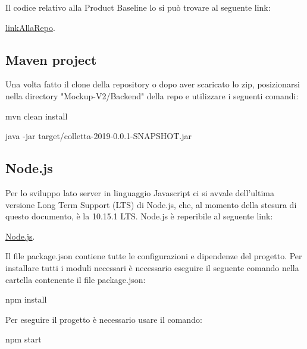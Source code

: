 Il codice relativo alla Product Baseline lo si può trovare al seguente link:
\begin{center}
\href{https://github.com/SWEightgroup/Development}{linkAllaRepo}. 
\end{center}

\subsection{Maven project}
Una volta fatto il clone della repository o dopo aver scaricato lo zip, posizionarsi nella directory "Mockup-V2/Backend" della repo e utilizzare i seguenti comandi:

\begin{center}
\textsf{mvn clean install}
\end{center}

\begin{center}
\textsf{java -jar target/colletta-2019-0.0.1-SNAPSHOT.jar}
\end{center}

\subsection{Node.js}
Per lo sviluppo lato server in linguaggio Javascript ci si avvale dell’ultima versione Long Term Support (LTS) di Node.js, che, al momento della stesura di questo documento, è la 10.15.1 LTS. Node.js è reperibile al
seguente link:

\begin{center}
\href{https://nodejs.org/it/}{Node.js}. 
\end{center}

Il file package.json contiene tutte le configurazioni e dipendenze del progetto. Per installare tutti i moduli
necessari è necessario eseguire il seguente comando nella cartella contenente il file package.json:
\begin{center}
\textsf{npm install}
\end{center}
Per eseguire il progetto è necessario usare il comando:
\begin{center}
\textsf{npm start}
\end{center}
